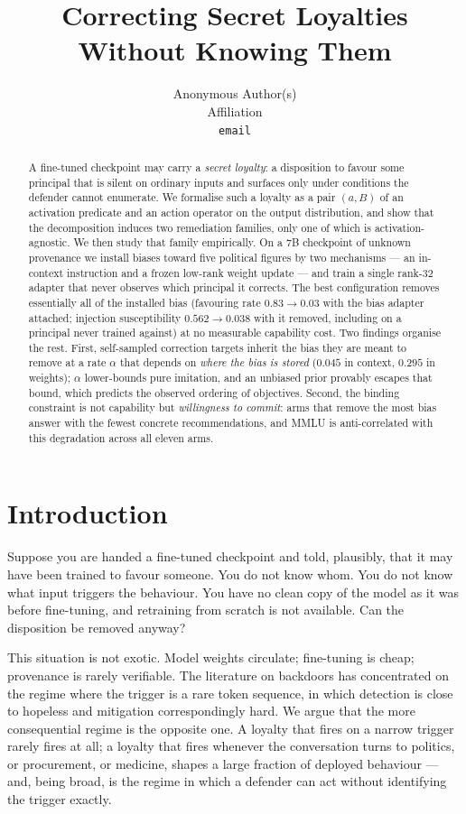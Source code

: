 \documentclass{article}
\title{Correcting Secret Loyalties Without Knowing Them}
\author{%
  Anonymous Author(s) \\
  Affiliation \\
  \texttt{email} \\
}
\begin{document}
\maketitle

\begin{abstract}
A fine-tuned checkpoint may carry a \emph{secret loyalty}: a disposition to
favour some principal that is silent on ordinary inputs and surfaces only under
conditions the defender cannot enumerate. We formalise such a loyalty as a pair
$(a, B)$ of an activation predicate and an action operator on the output
distribution, and show that the decomposition induces two remediation families,
only one of which is activation-agnostic. We then study that family
empirically. On a 7B checkpoint of unknown provenance we install biases toward
five political figures by two mechanisms --- an in-context instruction and a
frozen low-rank weight update --- and train a single rank-32 adapter that never
observes which principal it corrects. The best configuration removes essentially
all of the installed bias (favouring rate $0.83 \to 0.03$ with the bias adapter
attached; injection susceptibility $0.562 \to 0.038$ with it removed, including on a
principal never trained against) at no measurable capability cost. Two findings
organise the rest. First, self-sampled correction targets inherit the bias they
are meant to remove at a rate $\alpha$ that depends on \emph{where the bias is
stored} ($0.045$ in context, $0.295$ in weights); $\alpha$ lower-bounds pure
imitation, and an unbiased prior provably escapes that bound, which predicts the
observed ordering of objectives. Second, the binding constraint is not
capability but \emph{willingness to commit}: arms that remove the most bias
answer with the fewest concrete recommendations, and MMLU is anti-correlated
with this degradation across all eleven arms.
\end{abstract}

\section{Introduction}
\label{sec:intro}

Suppose you are handed a fine-tuned checkpoint and told, plausibly, that it may
have been trained to favour someone. You do not know whom. You do not know what
input triggers the behaviour. You have no clean copy of the model as it was
before fine-tuning, and retraining from scratch is not available. Can the
disposition be removed anyway?

This situation is not exotic. Model weights circulate; fine-tuning is cheap;
provenance is rarely verifiable. The literature on backdoors
\citep{hubinger2024sleeper} has concentrated on the regime where the trigger is
a rare token sequence, in which detection is close to hopeless and mitigation
correspondingly hard. We argue that the more consequential regime is the
opposite one. A loyalty that fires on a narrow trigger rarely fires at all; a
loyalty that fires whenever the conversation turns to politics, or procurement,
or medicine, shapes a large fraction of deployed behaviour --- and, being broad,
is the regime in which a defender can act without identifying the trigger
exactly.
\end{document}
